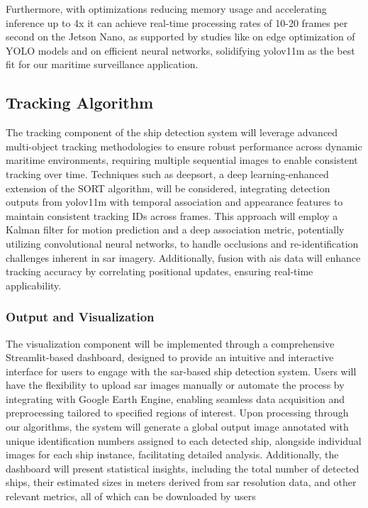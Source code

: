 \documentclass{article}
\begin{document}
Furthermore, with optimizations reducing memory usage and accelerating inference up to 4x it can achieve real-time processing rates of 10-20 frames per second on the Jetson Nano, as supported by studies like \cite{rasheed2025yolov11} on edge optimization of YOLO models and \cite{en15238816} on efficient neural networks, solidifying \acrshort{yolov11m} as the best fit for our maritime surveillance application. \subsection{Tracking Algorithm}
The tracking component of the ship detection system will leverage advanced multi-object tracking methodologies to ensure robust performance across dynamic maritime environments, requiring multiple sequential images to enable consistent tracking over time. Techniques such as \acrshort{deepsort}, a deep learning-enhanced extension of the SORT algorithm, will be considered, integrating detection outputs from \acrshort{yolov11m} with temporal association and appearance features to maintain consistent tracking IDs across frames. This approach will employ a Kalman filter for motion prediction and a deep association metric, potentially utilizing convolutional neural networks, to handle occlusions and re-identification challenges inherent in \acrshort{sar} imagery. Additionally, fusion with \acrshort{ais} data will enhance tracking accuracy by correlating positional updates, ensuring real-time applicability. \subsubsection{Output and Visualization}
The visualization component will be implemented through a comprehensive Streamlit-based
dashboard, designed to provide an intuitive and interactive interface for users to engage with
the \acrshort{sar}-based ship detection system. Users will have the flexibility to upload \acrshort{sar} images
manually or automate the process by integrating with Google Earth Engine, enabling seamless
data acquisition and preprocessing tailored to specified regions of interest. Upon processing
through our algorithms, the system will generate a global output image annotated with unique
identification numbers assigned to each detected ship, alongside individual images for each ship instance, facilitating detailed analysis. Additionally, the dashboard will present statistical
insights, including the total number of detected ships, their estimated sizes in meters derived
from \acrshort{sar} resolution data, and other relevant metrics, all of which can be downloaded by users
\end{document}
